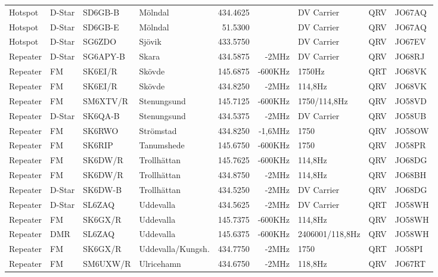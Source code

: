 \begin{landscape}
\begin{longtable}{llllrrlcl}
Hotspot  & D-Star & SD6GB-B  & Mölndal             & 434.4625  &         & DV Carrier      & QRV  & JO67AQ \\
Hotspot  & D-Star & SD6GB-E  & Mölndal             & 51.5300   &         & DV Carrier      & QRV  & JO67AQ \\
Hotspot  & D-Star & SG6ZDO   & Sjövik              & 433.5750  &         & DV Carrier      & QRV  & JO67EV \\
Repeater & D-Star & SG6APY-B & Skara               & 434.5875  & -2MHz   & DV Carrier      & QRV  & JO68RJ \\
Repeater & FM     & SK6EI/R  & Skövde              & 145.6875  & -600KHz & 1750Hz          & QRT  & JO68VK \\
Repeater & FM     & SK6EI/R  & Skövde              & 434.8250  & -2MHz   & 114,8Hz         & QRV  & JO68VK \\
Repeater & FM     & SM6XTV/R & Stenungsund         & 145.7125  & -600KHz & 1750/114,8Hz    & QRV  & JO58VD \\
Repeater & D-Star & SK6QA-B  & Stenungsund         & 434.5375  & -2MHz   & DV Carrier      & QRV  & JO58UB \\
Repeater & FM     & SK6RWO   & Strömstad           & 434.8250  & -1,6MHz & 1750            & QRV  & JO58OW \\
Repeater & FM     & SK6RIP   & Tanumshede          & 145.6750  & -600KHz & 1750            & QRV  & JO58PR \\
Repeater & FM     & SK6DW/R  & Trollhättan         & 145.7625  & -600KHz & 114,8Hz         & QRV  & JO68DG \\
Repeater & FM     & SK6DW/R  & Trollhättan         & 434.8750  & -2MHz   & 114,8Hz         & QRV  & JO68BH \\
Repeater & D-Star & SK6DW-B  & Trollhättan         & 434.5250  & -2MHz   & DV Carrier      & QRV  & JO68DG \\
Repeater & D-Star & SL6ZAQ   & Uddevalla           & 434.5625  & -2MHz   & DV Carrier      & QRT  & JO58WH \\
Repeater & FM     & SK6GX/R  & Uddevalla           & 145.7375  & -600KHz & 114,8Hz         & QRV  & JO58WH \\
Repeater & DMR    & SL6ZAQ   & Uddevalla           & 145.6375  & -600KHz & 2406001/118,8Hz & QRV  & JO58WH \\
Repeater & FM     & SK6GX/R  & Uddevalla/Kungsh.   & 434.7750  & -2MHz   & 1750            & QRT  & JO58PI \\
Repeater & FM     & SM6UXW/R & Ulricehamn          & 434.6750  & -2MHz   & 118,8Hz         & QRV  & JO67RT \\

\end{longtable}
\end{landscape}
